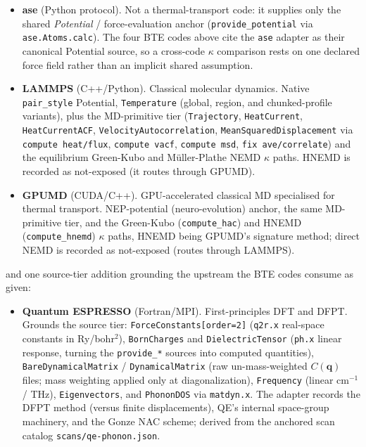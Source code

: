 \documentclass[11pt,a4paper]{article}
\begin{document}
\begin{itemize}[leftmargin=2em]
  \item \textbf{ase} (Python protocol). Not a thermal-transport code: it supplies
        only the shared \emph{Potential} / force-evaluation anchor
        (\texttt{provide\_potential} via \texttt{ase.Atoms.calc}). The four BTE
        codes above cite the \texttt{ase} adapter as their canonical Potential
        source, so a cross-code $\kappa$ comparison rests on one declared force
        field rather than an implicit shared assumption.
  \item \textbf{LAMMPS} (C++/Python). Classical molecular dynamics. Native
        \texttt{pair\_style} Potential, \texttt{Temperature} (global,
        region, and chunked-profile variants), plus the MD-primitive tier
        (\texttt{Trajectory}, \texttt{HeatCurrent}, \texttt{HeatCurrentACF},
        \texttt{VelocityAutocorrelation}, \texttt{MeanSquaredDisplacement} via
        \texttt{compute heat/flux}, \texttt{compute vacf}, \texttt{compute msd},
        \texttt{fix ave/correlate}) and the equilibrium Green-Kubo and
        Müller-Plathe NEMD $\kappa$ paths. HNEMD is recorded as not-exposed
        (it routes through GPUMD).
  \item \textbf{GPUMD} (CUDA/C++). GPU-accelerated classical MD specialised for
        thermal transport. NEP-potential (neuro-evolution) anchor, the same
        MD-primitive tier, and the Green-Kubo (\texttt{compute\_hac}) and
        HNEMD (\texttt{compute\_hnemd}) $\kappa$ paths, HNEMD being GPUMD's
        signature method; direct NEMD is recorded as not-exposed (routes
        through LAMMPS).
\end{itemize}

\noindent and one source-tier addition grounding the upstream the BTE codes
consume as given:

\begin{itemize}[leftmargin=2em]
  \item \textbf{Quantum ESPRESSO} (Fortran/MPI). First-principles DFT and
        DFPT. Grounds the source tier: \texttt{ForceConstants[order=2]}
        (\texttt{q2r.x} real-space constants in Ry/bohr$^2$),
        \texttt{BornCharges} and \texttt{DielectricTensor} (\texttt{ph.x}
        linear response, turning the \texttt{provide\_*} sources into
        computed quantities), \texttt{BareDynamicalMatrix} /
        \texttt{DynamicalMatrix} (raw un-mass-weighted $C(\mathbf{q})$
        files; mass weighting applied only at diagonalization),
        \texttt{Frequency} (linear cm$^{-1}$ / THz), \texttt{Eigenvectors},
        and \texttt{PhononDOS} via \texttt{matdyn.x}. The adapter records
        the DFPT method (versus finite displacements), QE's internal
        space-group machinery, and the Gonze NAC scheme; derived from the
        anchored scan catalog \texttt{scans/qe-phonon.json}.
\end{itemize}
\end{document}
